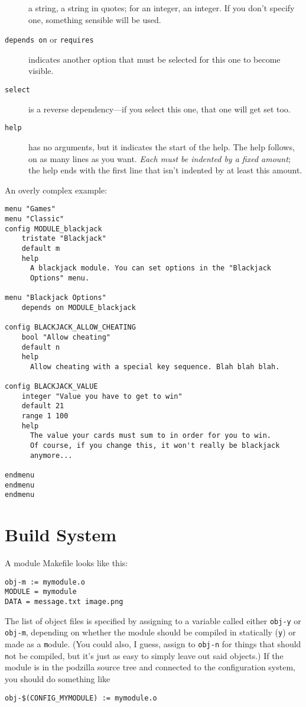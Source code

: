 \documentclass[12pt,letterpaper]{report}
\let\ttt\tt
\def\tt{\def\_{{\ttt\char`\_}}\ttt}
\begin{document}
\begin{description}
a string, a string in quotes; for an integer, an integer. If you don't specify one, something
sensible will be used.
\item[{\tt depends on} or {\tt requires}] indicates another option that must be selected for
this one to become visible.
\item[{\tt select}] is a reverse dependency---if you select this one, that one will get set too.
\item[{\tt help}] has no arguments, but it indicates the start of the help. The help follows, on
as many lines as you want. \emph{Each must be indented by a fixed amount}; the help ends with the first
line that isn't indented by at least this amount.
\end{description}

An overly complex example:
\begin{verbatim}
menu "Games"
menu "Classic"
config MODULE_blackjack
    tristate "Blackjack"
    default m
    help
      A blackjack module. You can set options in the "Blackjack
      Options" menu.

menu "Blackjack Options"
    depends on MODULE_blackjack

config BLACKJACK_ALLOW_CHEATING
    bool "Allow cheating"
    default n
    help
      Allow cheating with a special key sequence. Blah blah blah.

config BLACKJACK_VALUE
    integer "Value you have to get to win"
    default 21
    range 1 100
    help
      The value your cards must sum to in order for you to win.
      Of course, if you change this, it won't really be blackjack
      anymore...

endmenu
endmenu
endmenu
\end{verbatim}

\section{Build System}
A module Makefile looks like this:
\begin{verbatim}
obj-m := mymodule.o
MODULE = mymodule
DATA = message.txt image.png
\end{verbatim}

The list of object files is specified by assigning to a variable called either
\verb|obj-y| or \verb|obj-m|, depending on whether the module should be compiled in statically
(\verb|y|) or made as a \verb|m|odule. (You could also, I guess, assign to \verb|obj-n| for
things that should \verb|n|ot be compiled, but it's just as easy to simply leave out said objects.)
If the module is in the podzilla source tree and connected to the configuration system, you
should do something like
\begin{verbatim}
obj-$(CONFIG_MYMODULE) := mymodule.o
\end{verbatim}
\begin{comment}
$ Let's appease XEmacs!
\end{comment}
\end{document}

